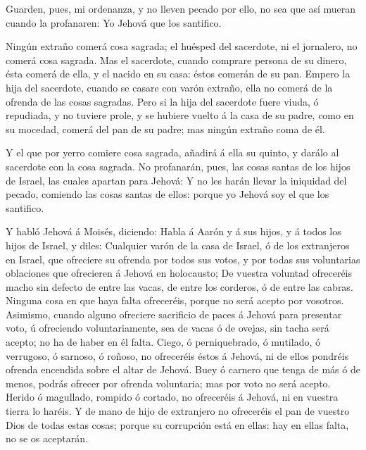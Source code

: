  Guarden, pues, mi ordenanza, y no lleven pecado por ello,
no sea que así mueran cuando la profanaren: Yo Jehová que los santifico.

 Ningún extraño comerá cosa sagrada; el huésped del
sacerdote, ni el jornalero, no comerá cosa sagrada.  Mas el
sacerdote, cuando comprare persona de su dinero, ésta comerá de ella, y
el nacido en su casa: éstos comerán de su pan.  Empero la
hija del sacerdote, cuando se casare con varón extraño, ella no comerá
de la ofrenda de las cosas sagradas.  Pero si la hija del
sacerdote fuere viuda, ó repudiada, y no tuviere prole, y se hubiere
vuelto á la casa de su padre, como en su mocedad, comerá del pan de su
padre; mas ningún extraño coma de él.

 Y el que por yerro comiere cosa sagrada, añadirá á ella su
quinto, y darálo al sacerdote con la cosa sagrada.  No
profanarán, pues, las cosas santas de los hijos de Israel, las cuales
apartan para Jehová:  Y no les harán llevar la iniquidad
del pecado, comiendo las cosas santas de ellos: porque yo Jehová soy el
que los santifico.

 Y habló Jehová á Moisés, diciendo:  Habla á
Aarón y á sus hijos, y á todos los hijos de Israel, y diles: Cualquier
varón de la casa de Israel, ó de los extranjeros en Israel, que
ofreciere su ofrenda por todos sus votos, y por todas sus voluntarias
oblaciones que ofrecieren á Jehová en holocausto;  De
vuestra voluntad ofreceréis macho sin defecto de entre las vacas, de
entre los corderos, ó de entre las cabras.  Ninguna cosa en
que haya falta ofreceréis, porque no será acepto por vosotros.
 Asimismo, cuando alguno ofreciere sacrificio de paces á
Jehová para presentar voto, ú ofreciendo voluntariamente, sea de vacas ó
de ovejas, sin tacha será acepto; no ha de haber en él falta.
 Ciego, ó perniquebrado, ó mutilado, ó verrugoso, ó
sarnoso, ó roñoso, no ofreceréis éstos á Jehová, ni de ellos pondréis
ofrenda encendida sobre el altar de Jehová.  Buey ó carnero
que tenga de más ó de menos, podrás ofrecer por ofrenda voluntaria; mas
por voto no será acepto.  Herido ó magullado, rompido ó
cortado, no ofreceréis á Jehová, ni en vuestra tierra lo haréis.
 Y de mano de hijo de extranjero no ofreceréis el pan de
vuestro Dios de todas estas cosas; porque su corrupción está en ellas:
hay en ellas falta, no se os aceptarán.

